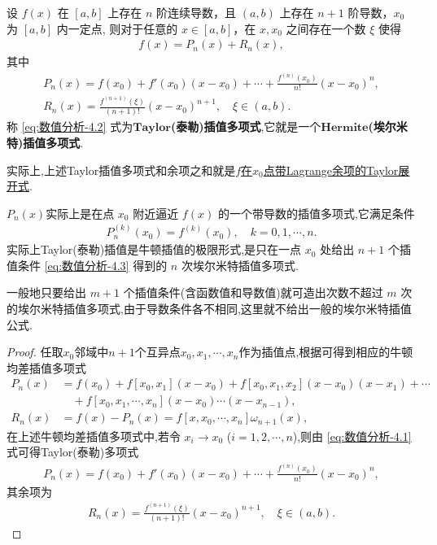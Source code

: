 \documentclass[../../main.tex]{subfiles}%
\begin{document}
\begin{theorem}
设 $f(x)$ 在 $[a, b]$ 上存在 $n$ 阶连续导数，且 $(a, b)$ 上存在 $n + 1$ 阶导数，$x_0$ 为 $[a, b]$ 内一定点,
则对于任意的 $x \in [a, b]$，在 $x, x_0$ 之间存在一个数 $\xi$ 使得
\begin{align*}
f(x) = P_n(x)+R_n(x),
\end{align*}
其中
\begin{gather}
P_n(x) = f(x_0) + f'(x_0)(x - x_0) + \cdots + \frac{f^{(n)}(x_0)}{n!}(x - x_0)^n,\label{eq:数值分析-4.2}
\\
R_n(x) = \frac{f^{(n+1)}(\xi)}{(n+1)!}(x - x_0)^{n+1}, \quad \xi \in (a, b).\label{eq:数值分析-4.4}
\end{gather}
称 \eqref{eq:数值分析-4.2} 式为$\mathbf{Taylor}$\textbf{(泰勒)插值多项式},它就是一个$\mathbf{Hermite}$\textbf{(埃尔米特)插值多项式}.
\end{theorem}
\begin{remark}
实际上,上述Taylor插值多项式和余项之和就是\hyperref[Basis of Analytics-theorem:带各种余项的Taylor公式]{$f$在$x_0$点带Lagrange余项的Taylor展开式}.
\end{remark}
\begin{remark}
$P_n(x)$实际上是在点 $x_0$ 附近逼近 $f(x)$ 的一个带导数的插值多项式,它满足条件
\begin{align}
P_n^{(k)}(x_0) = f^{(k)}(x_0), \quad k = 0, 1, \cdots, n. \label{eq:数值分析-4.3}
\end{align}
实际上Taylor(泰勒)插值是牛顿插值的极限形式,是只在一点 $x_0$ 处给出 $n + 1$ 个插值条件 \eqref{eq:数值分析-4.3} 得到的 $n$ 次埃尔米特插值多项式.

一般地只要给出 $m + 1$ 个插值条件(含函数值和导数值)就可造出次数不超过 $m$ 次的埃尔米特插值多项式,由于导数条件各不相同,这里就不给出一般的埃尔米特插值公式.
\end{remark}
\begin{proof}
任取$x_0$邻域中$n+1$个互异点$x_0,x_1,\cdots,x_n$作为插值点,根据可得到相应的牛顿均差插值多项式
\begin{align*}
P_n(x) &= f(x_0) + f[x_0, x_1](x - x_0) + f[x_0, x_1, x_2](x - x_0)(x - x_1) + \cdots  \\
&\quad + f[x_0, x_1, \cdots, x_n](x - x_0) \cdots (x - x_{n-1}),\\
R_n(x) &= f(x) - P_n(x) = f[x, x_0, \cdots, x_n]\omega_{n+1}(x),
\end{align*}
在上述牛顿均差插值多项式中,若令 $x_i \to x_0$ ($i = 1, 2, \cdots, n$),则由 \eqref{eq:数值分析-4.1} 式可得Taylor(泰勒)多项式
\begin{align*}
P_n(x) = f(x_0) + f'(x_0)(x - x_0) + \cdots + \frac{f^{(n)}(x_0)}{n!}(x - x_0)^n, 
\end{align*}
其余项为
\begin{align*}
R_n(x) = \frac{f^{(n+1)}(\xi)}{(n+1)!}(x - x_0)^{n+1}, \quad \xi \in (a, b). 
\end{align*}
\end{proof}
\end{document}
